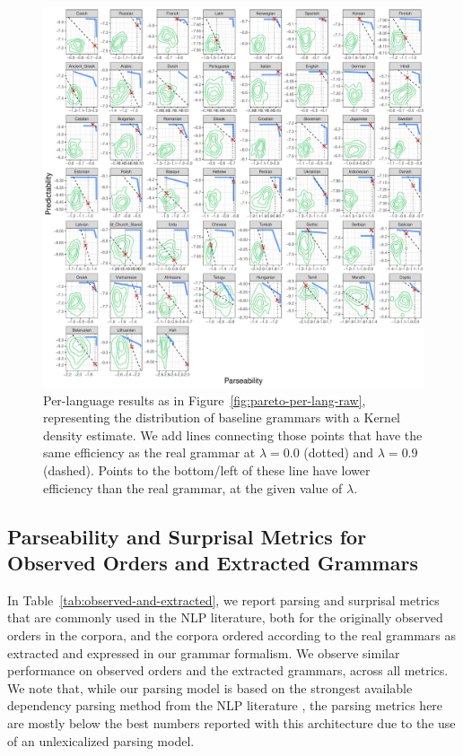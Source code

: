 \documentclass[10pt,twoside,lineno]{article}
\begin{document}
\begin{figure}
\centering
\includegraphics[width=\textwidth]{../results/plane/analyze_pareto_optimality/pareto-plane-perLanguage-arrows-smoothed-halfspace-untransformed.pdf}
	\caption[]{Per-language results as in Figure~\ref{fig:pareto-per-lang-raw}, representing the distribution of baseline grammars with a Kernel density estimate. We add lines connecting those points that have the same efficiency as the real grammar at $\lambda = 0.0$ (dotted) and $\lambda = 0.9$ (dashed). Points to the bottom/left of these line have lower efficiency than the real grammar, at the given value of $\lambda$.}\label{fig:lambda-halfplane-09}
\end{figure}



\subsection{Parseability and Surprisal Metrics for Observed Orders and Extracted Grammars}

In Table~\ref{tab:observed-and-extracted}, we report parsing and surprisal metrics that are commonly used in the NLP literature, both for the originally observed orders in the corpora, and the corpora ordered according to the real grammars as extracted and expressed in our grammar formalism.
We observe similar performance on observed orders and the extracted grammars, across all metrics.
We note that, while our parsing model is based on the strongest available dependency parsing method from the NLP literature \cite{dozat2017stanford,zeman2018proceedings,che2018towards}, the parsing metrics here are mostly below the best numbers reported with this architecture \cite{zeman2018proceedings} due to the use of an unlexicalized parsing model.
\end{document}
